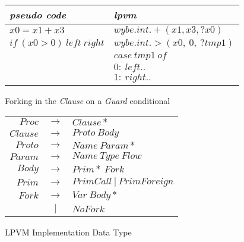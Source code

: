 \begin{figure}
  \centering
  \begin{tabular}{l@{\hskip 1in} | l}
    \textit{pseudo code} & \textit{lpvm} \\ \hline
    \( x0 = x1 + x3 \)              & \( wybe.int.+(x1, x3, ?x0) \) \\
    \( if\ (x0 > 0)\ left\ right \) & \( wybe.int.>(x0,\ 0,\ ?tmp1) \) \\
                                    & \( case\ tmp1\ of \) \\
                                    & \( 0:\ left.. \) \\
                                    & \( 1:\ right.. \) \\
    

  \end{tabular}
  \label{fig:forking}
  \caption{Forking in the \textit{Clause} on a \textit{Guard} conditional}
\end{figure}

\begin{figure}
  \centering
  \begin{tabular}{r c l}
    \( Proc \)   & \( \rightarrow \) & \( Clause* \) \\
    \( Clause \) & \( \rightarrow \) & \( Proto\ Body \) \\
    \( Proto \)  & \( \rightarrow \) & \( Name\ Param* \) \\
    \( Param \)  & \( \rightarrow \) & \( Name\ Type\ Flow \) \\
    \( Body \)   & \( \rightarrow \) & \( Prim*\ Fork \) \\
    \( Prim \)   & \( \rightarrow \) & \( PrimCall\ |\ PrimForeign \) \\
    \( Fork \)   & \( \rightarrow \) & \( Var\ Body* \) \\
                 & \( \rvert \)      & \( NoFork \) \\
  \end{tabular}
  \caption{LPVM Implementation Data Type}
  \label{fig:lpvm_data_type}
\end{figure}


